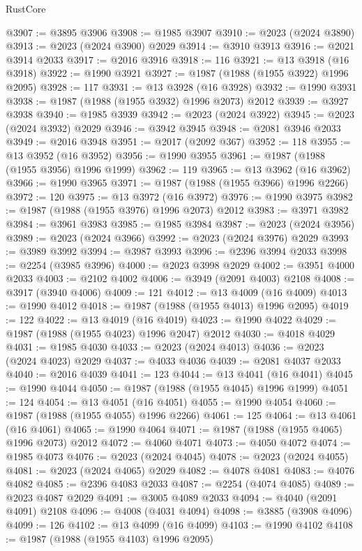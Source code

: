 \begin{lexlean}{RustCore}
\begin{coremodule}
@3907 := @3895 @3906
@3908 := @1985 @3907
@3910 := @2023 (@2024 @3890)
@3913 := @2023 (@2024 @3900) @2029
@3914 := @3910 @3913
@3916 := @2021 @3914 @2033
@3917 := @2016 @3916
@3918 := 116
@3921 := @13 @3918 (@16 @3918)
@3922 := @1990 @3921
@3927 := @1987 (@1988 (@1955 @3922) @1996 @2095)
@3928 := 117
@3931 := @13 @3928 (@16 @3928)
@3932 := @1990 @3931
@3938 := @1987 (@1988 (@1955 @3932) @1996 @2073) @2012
@3939 := @3927 @3938
@3940 := @1985 @3939
@3942 := @2023 (@2024 @3922)
@3945 := @2023 (@2024 @3932) @2029
@3946 := @3942 @3945
@3948 := @2081 @3946 @2033
@3949 := @2016 @3948
@3951 := @2017 (@2092 @367)
@3952 := 118
@3955 := @13 @3952 (@16 @3952)
@3956 := @1990 @3955
@3961 := @1987 (@1988 (@1955 @3956) @1996 @1999)
@3962 := 119
@3965 := @13 @3962 (@16 @3962)
@3966 := @1990 @3965
@3971 := @1987 (@1988 (@1955 @3966) @1996 @2266)
@3972 := 120
@3975 := @13 @3972 (@16 @3972)
@3976 := @1990 @3975
@3982 := @1987 (@1988 (@1955 @3976) @1996 @2073) @2012
@3983 := @3971 @3982
@3984 := @3961 @3983
@3985 := @1985 @3984
@3987 := @2023 (@2024 @3956)
@3989 := @2023 (@2024 @3966)
@3992 := @2023 (@2024 @3976) @2029
@3993 := @3989 @3992
@3994 := @3987 @3993
@3996 := @2396 @3994 @2033
@3998 := @2254 (@3985 @3996)
@4000 := @2023 @3998 @2029
@4002 := @3951 @4000 @2033
@4003 := @2102 @4002
@4006 := @3949 (@2091 @4003) @2108
@4008 := @3917 (@3940 @4006)
@4009 := 121
@4012 := @13 @4009 (@16 @4009)
@4013 := @1990 @4012
@4018 := @1987 (@1988 (@1955 @4013) @1996 @2095)
@4019 := 122
@4022 := @13 @4019 (@16 @4019)
@4023 := @1990 @4022
@4029 := @1987 (@1988 (@1955 @4023) @1996 @2047) @2012
@4030 := @4018 @4029
@4031 := @1985 @4030
@4033 := @2023 (@2024 @4013)
@4036 := @2023 (@2024 @4023) @2029
@4037 := @4033 @4036
@4039 := @2081 @4037 @2033
@4040 := @2016 @4039
@4041 := 123
@4044 := @13 @4041 (@16 @4041)
@4045 := @1990 @4044
@4050 := @1987 (@1988 (@1955 @4045) @1996 @1999)
@4051 := 124
@4054 := @13 @4051 (@16 @4051)
@4055 := @1990 @4054
@4060 := @1987 (@1988 (@1955 @4055) @1996 @2266)
@4061 := 125
@4064 := @13 @4061 (@16 @4061)
@4065 := @1990 @4064
@4071 := @1987 (@1988 (@1955 @4065) @1996 @2073) @2012
@4072 := @4060 @4071
@4073 := @4050 @4072
@4074 := @1985 @4073
@4076 := @2023 (@2024 @4045)
@4078 := @2023 (@2024 @4055)
@4081 := @2023 (@2024 @4065) @2029
@4082 := @4078 @4081
@4083 := @4076 @4082
@4085 := @2396 @4083 @2033
@4087 := @2254 (@4074 @4085)
@4089 := @2023 @4087 @2029
@4091 := @3005 @4089 @2033
@4094 := @4040 (@2091 @4091) @2108
@4096 := @4008 (@4031 @4094)
@4098 := @3885 (@3908 @4096)
@4099 := 126
@4102 := @13 @4099 (@16 @4099)
@4103 := @1990 @4102
@4108 := @1987 (@1988 (@1955 @4103) @1996 @2095)

\end{coremodule}
\end{lexlean}
